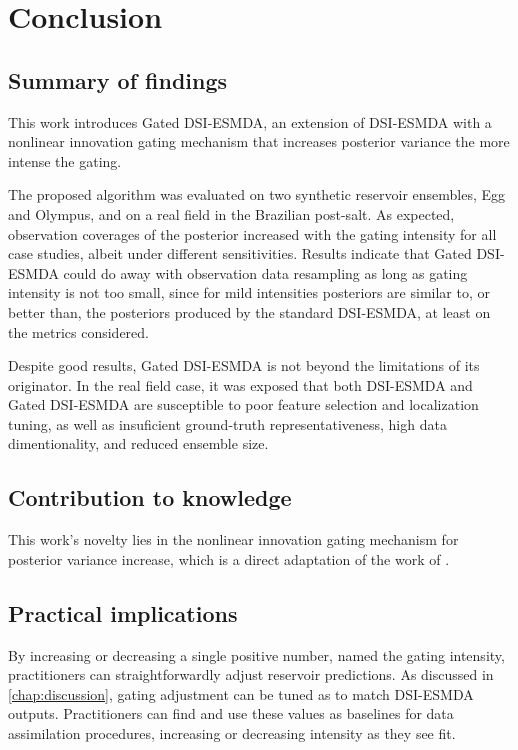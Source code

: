 \chapter{Conclusion}
\label{chap:conclusion}

\section{Summary of findings}		
    This work introduces Gated DSI-ESMDA, an extension of DSI-ESMDA 
    with a nonlinear innovation gating mechanism that increases posterior variance 
    the more intense the gating.

    The proposed algorithm was evaluated on two synthetic reservoir ensembles, 
    Egg and Olympus, and on a real field in the Brazilian post-salt.
    As expected, observation coverages of the posterior increased with the gating intensity for all case studies,
    albeit under different sensitivities.
    Results indicate that Gated DSI-ESMDA could do away with observation data resampling as long as gating intensity is not too small,
    since for mild intensities posteriors are similar to, or better than, the posteriors produced by the standard DSI-ESMDA,
    at least on the metrics considered.
    
    Despite good results, Gated DSI-ESMDA is not beyond the limitations of its originator.
    In the real field case, it was exposed that both DSI-ESMDA and Gated DSI-ESMDA 
    are susceptible to poor feature selection and localization tuning,
    as well as insuficient ground-truth representativeness, 
    high data dimentionality, and reduced ensemble size. 

\section{Contribution to knowledge}	
    This work's novelty lies in the nonlinear innovation gating mechanism for posterior variance increase,
    which is a direct adaptation of the work of .

\section{Practical implications}	
    By increasing or decreasing a single positive number, named the gating intensity,
    practitioners can straightforwardly adjust reservoir predictions.
    As discussed in \cref{chap:discussion}, gating adjustment can be tuned as to match
    DSI-ESMDA outputs.
    Practitioners can find and use these values as baselines for data assimilation procedures,
    increasing or decreasing intensity as they see fit.
    
